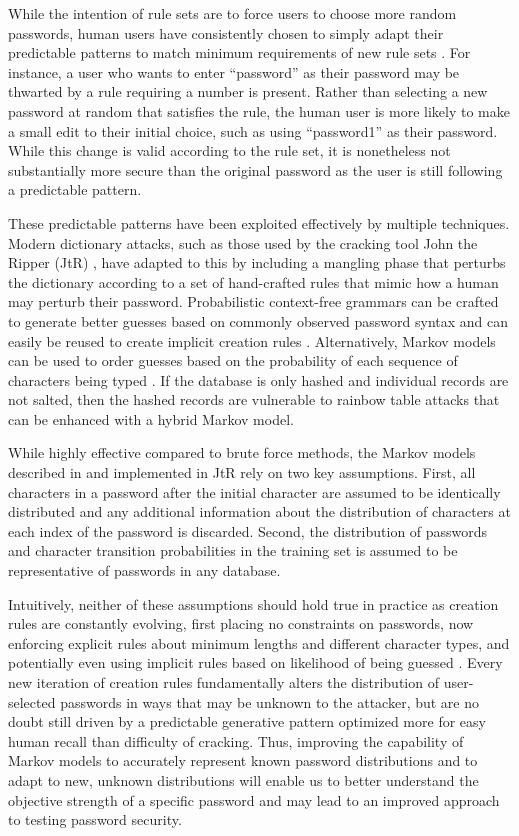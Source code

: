 \documentclass{acm_proc_article-sp}
\begin{document}
While the intention of rule sets are to force users to choose more random passwords, human users have consistently chosen to simply adapt their predictable patterns to match minimum requirements of new rule sets \cite{thorsheim-passwords11}. For instance, a user who wants to enter ``password'' as their password may be thwarted by a rule requiring a number is present. Rather than selecting a new password at random that satisfies the rule, the human user is more likely to make a small edit to their initial choice, such as using ``password1'' as their password. While this change is valid according to the rule set, it is nonetheless not substantially more secure than the original password as the user is still following a predictable pattern.

These predictable patterns have been exploited effectively by multiple techniques. Modern dictionary attacks, such as those used by the cracking tool John the Ripper (JtR) \cite{johntheripper}, have adapted to this by including a mangling phase that perturbs the dictionary according to a set of hand-crafted rules that mimic how a human may perturb their password. Probabilistic context-free grammars can be crafted to generate better guesses based on commonly observed password syntax \cite{weir-ssp09} and can easily be reused to create implicit creation rules \cite{weir-ccs10}. Alternatively, Markov models can be used to order guesses based on the probability of each sequence of characters being typed \cite{narayanan-ccs05}. If the database is only hashed and individual records are not salted, then the hashed records are vulnerable to rainbow table attacks \cite{oechslin-crypto03} that can be enhanced with a hybrid Markov model.

While highly effective compared to brute force methods, the Markov models described in \cite{narayanan-ccs05} and implemented in JtR rely on two key assumptions. First, all characters in a password after the initial character are assumed to be identically distributed and any additional information about the distribution of characters at each index of the password is discarded. Second, the distribution of passwords and character transition probabilities in the training set is assumed to be representative of passwords in any database.

Intuitively, neither of these assumptions should hold true in practice as creation rules are constantly evolving, first placing no constraints on passwords, now enforcing explicit rules about minimum lengths and different character types, and potentially even using implicit rules based on likelihood of being guessed \cite{weir-ccs10}. Every new iteration of creation rules fundamentally alters the distribution of user-selected passwords in ways that may be unknown to the attacker, but are no doubt still driven by a predictable generative pattern optimized more for easy human recall than difficulty of cracking. Thus, improving the capability of Markov models to accurately represent known password distributions and to adapt to new, unknown distributions will enable us to better understand the objective strength of a specific password and may lead to an improved approach to testing password security.
\end{document}
